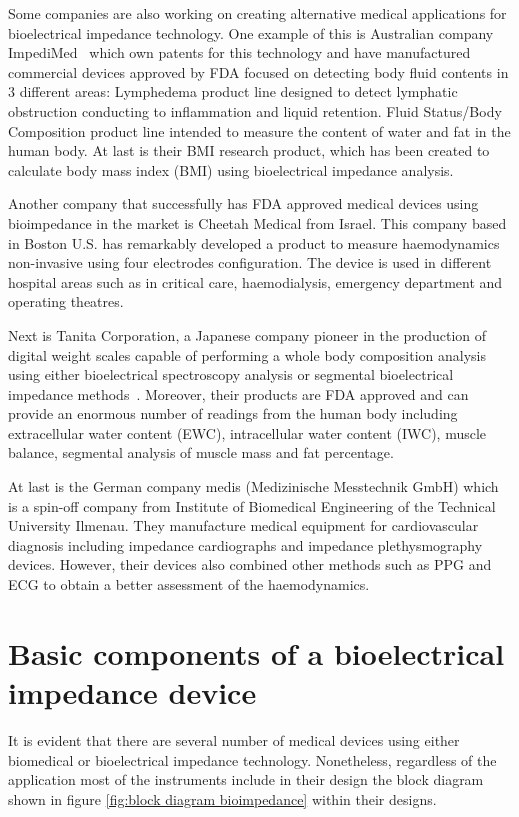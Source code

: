 Some companies are also working on creating alternative medical applications for bioelectrical impedance technology. One example of this is Australian company ImpediMed~\cite{impedimed} which own patents for this technology and have manufactured commercial devices approved by FDA focused on detecting body fluid contents in 3 different areas: Lymphedema product line designed to detect lymphatic obstruction conducting to inflammation and liquid retention.  Fluid Status/Body Composition product line intended to measure the content of water and fat in the human body. At last is their BMI research product, which has been created to calculate body mass index (BMI) using bioelectrical impedance analysis.

Another company that successfully has FDA approved medical devices using bioimpedance in the market is Cheetah Medical \cite{cheetah} from Israel. This company based in Boston U.S. has remarkably developed a product to measure haemodynamics non-invasive using four electrodes configuration. The device is used in different hospital areas such as in critical care, haemodialysis, emergency department and operating theatres.

Next is Tanita Corporation, a Japanese company pioneer in the production of digital weight scales capable of performing a whole body composition analysis using either bioelectrical spectroscopy analysis or segmental bioelectrical impedance methods~\cite{tanita}. Moreover, their products are FDA approved and can provide an enormous number of readings from the human body including extracellular water content (EWC), intracellular water content (IWC), muscle balance, segmental analysis of muscle mass and fat percentage.

At last is the German company medis (Medizinische Messtechnik GmbH) which is a spin-off company from Institute of Biomedical Engineering of the Technical University Ilmenau. They manufacture medical equipment for cardiovascular diagnosis including impedance cardiographs and impedance plethysmography devices. However, their devices also combined other methods such as PPG and ECG to obtain a better assessment of the haemodynamics. 

\section{Basic components of a bioelectrical impedance device}
\label{section impedance 7}
It is evident that there are several number of medical devices using either biomedical or bioelectrical impedance technology. Nonetheless, regardless of the application most of the instruments include in their design the block diagram shown in figure \ref{fig:block diagram bioimpedance} within their designs. 

